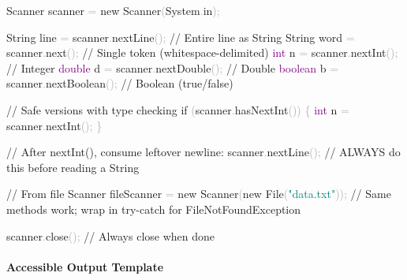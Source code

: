 \documentclass[
  justified,
  openright,
]{tufte-book}
\let\subsubsection\paragraph
\let\paragraph\paragraph
\newcommand{\BuiltInTok}[1]{#1}
\newcommand{\CommentTok}[1]{\textcolor{MidGray}{#1}}
\newcommand{\ControlFlowTok}[1]{\textcolor{BrandBlue}{#1}}
\newcommand{\DataTypeTok}[1]{\textcolor{Purple}{#1}}
\newcommand{\FunctionTok}[1]{\textcolor{BrandBlue}{#1}}
\newcommand{\KeywordTok}[1]{\textcolor{BrandBlue}{#1}}
\newcommand{\NormalTok}[1]{#1}
\newcommand{\OperatorTok}[1]{\textcolor{DarkGray}{#1}}
\newcommand{\StringTok}[1]{\textcolor{Teal}{#1}}
\newenvironment{Shaded}{%
  \begin{snugshade}
}{%
  \end{snugshade}
}
\let\subsubsection\paragraph
\let\paragraph\paragraph
\begin{document}
\begin{Shaded}
\begin{Highlighting}[]
\BuiltInTok{Scanner}\NormalTok{ scanner }\OperatorTok{=} \KeywordTok{new} \BuiltInTok{Scanner}\OperatorTok{(}\BuiltInTok{System}\OperatorTok{.}\FunctionTok{in}\OperatorTok{);}

\BuiltInTok{String}\NormalTok{ line   }\OperatorTok{=}\NormalTok{ scanner}\OperatorTok{.}\FunctionTok{nextLine}\OperatorTok{();}     \CommentTok{// Entire line as String}
\BuiltInTok{String}\NormalTok{ word   }\OperatorTok{=}\NormalTok{ scanner}\OperatorTok{.}\FunctionTok{next}\OperatorTok{();}         \CommentTok{// Single token (whitespace{-}delimited)}
\DataTypeTok{int}\NormalTok{ n         }\OperatorTok{=}\NormalTok{ scanner}\OperatorTok{.}\FunctionTok{nextInt}\OperatorTok{();}      \CommentTok{// Integer}
\DataTypeTok{double}\NormalTok{ d      }\OperatorTok{=}\NormalTok{ scanner}\OperatorTok{.}\FunctionTok{nextDouble}\OperatorTok{();}   \CommentTok{// Double}
\DataTypeTok{boolean}\NormalTok{ b     }\OperatorTok{=}\NormalTok{ scanner}\OperatorTok{.}\FunctionTok{nextBoolean}\OperatorTok{();}  \CommentTok{// Boolean (true/false)}

\CommentTok{// Safe versions with type checking}
\ControlFlowTok{if} \OperatorTok{(}\NormalTok{scanner}\OperatorTok{.}\FunctionTok{hasNextInt}\OperatorTok{())} \OperatorTok{\{}
    \DataTypeTok{int}\NormalTok{ n }\OperatorTok{=}\NormalTok{ scanner}\OperatorTok{.}\FunctionTok{nextInt}\OperatorTok{();}
\OperatorTok{\}}

\CommentTok{// After nextInt(), consume leftover newline:}
\NormalTok{scanner}\OperatorTok{.}\FunctionTok{nextLine}\OperatorTok{();}  \CommentTok{// ALWAYS do this before reading a String}

\CommentTok{// From file}
\BuiltInTok{Scanner}\NormalTok{ fileScanner }\OperatorTok{=} \KeywordTok{new} \BuiltInTok{Scanner}\OperatorTok{(}\KeywordTok{new} \BuiltInTok{File}\OperatorTok{(}\StringTok{"data.txt"}\OperatorTok{));}
\CommentTok{// Same methods work; wrap in try{-}catch for FileNotFoundException}

\NormalTok{scanner}\OperatorTok{.}\FunctionTok{close}\OperatorTok{();}  \CommentTok{// Always close when done}
\end{Highlighting}
\end{Shaded}

\subsubsection{Accessible Output
Template}\label{accessible-output-template}
\end{document}
